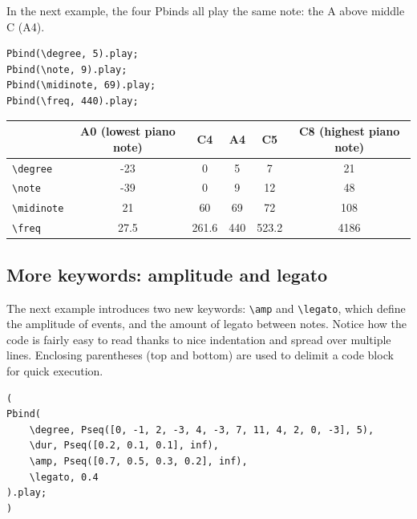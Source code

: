 In the next example, the four Pbinds all play the same note: the A above middle C (A4).

\begin{lstlisting}[style=SuperCollider-IDE, basicstyle=\scttfamily\footnotesize]
Pbind(\degree, 5).play;
Pbind(\note, 9).play;
Pbind(\midinote, 69).play;
Pbind(\freq, 440).play;
\end{lstlisting}


\bigskip
{}
\bigskip


\begin{tabular}{|l|c|c|c|c|c|}
\hline 
  & \textbf{A0 (lowest piano note)} & \textbf{C4} & \textbf{A4} & \textbf{C5} & \textbf{C8 (highest piano note)} \\ 
\hline 
\texttt{\textbackslash degree} & -23 & 0 & 5 & 7 & 21 \\
\hline
\texttt{\textbackslash note} & -39 & 0 & 9 & 12 & 48 \\
\hline
\texttt{\textbackslash midinote} & 21 & 60 & 69 & 72 & 108 \\
\hline
\texttt{\textbackslash freq} & 27.5 & 261.6 & 440 & 523.2 & 4186 \\
\hline
\end{tabular}
\bigskip


\subsection{More keywords: amplitude and legato}

The next example introduces two new keywords: \texttt{\textbackslash amp} and \texttt{\textbackslash legato}, which define the amplitude of events, and the amount of legato between notes. Notice how the code is fairly easy to read thanks to nice indentation and spread over multiple lines. Enclosing parentheses (top and bottom) are used to delimit a code block for quick execution.

 
\begin{lstlisting}[style=SuperCollider-IDE, basicstyle=\scttfamily\footnotesize]
(
Pbind(
	\degree, Pseq([0, -1, 2, -3, 4, -3, 7, 11, 4, 2, 0, -3], 5),
	\dur, Pseq([0.2, 0.1, 0.1], inf),
	\amp, Pseq([0.7, 0.5, 0.3, 0.2], inf),
	\legato, 0.4
).play;
)
\end{lstlisting}
 

